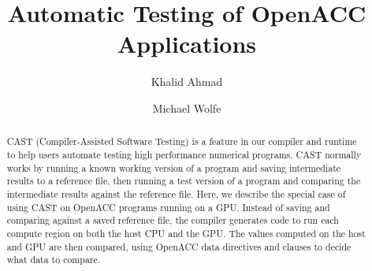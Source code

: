 \documentclass{llncs}
\begin{document}
\title{Automatic Testing of OpenACC Applications}
%
%
\author{Khalid Ahmad \and Michael Wolfe}
%
%
%

\maketitle              %

\begin{abstract}
CAST (Compiler-Assisted Software Testing) is a feature in our compiler and runtime to help users automate testing high performance numerical programs.
CAST normally works by running a known working version of a program and saving intermediate results to a reference file, then running a test version of a program and comparing the intermediate results against the reference file.
Here, we describe the special case of using CAST on OpenACC programs running on a GPU.
Instead of saving and comparing against a saved reference file, the compiler generates code to run each compute region on both the host CPU and the GPU.
The values computed on the host and GPU are then compared, using OpenACC data directives and clauses to decide what data to compare.
\end{abstract}
%








%


\end{document}
